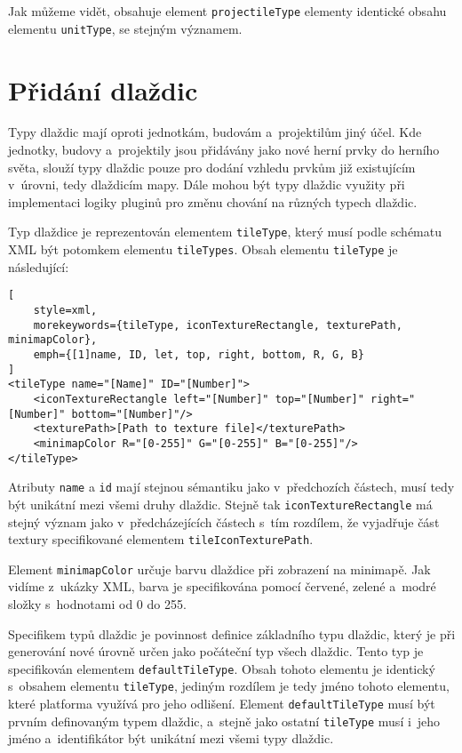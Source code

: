 Jak můžeme vidět, obsahuje element \texttt{projectileType} elementy identické obsahu elementu \texttt{unitType}, se stejným významem.


\section{Přidání dlaždic}
Typy dlaždic mají oproti jednotkám, budovám a~projektilům jiný účel. Kde jednotky, budovy a~projektily jsou přidávány jako nové herní prvky do herního světa, slouží typy dlaždic pouze pro dodání vzhledu prvkům již existujícím v~úrovni, tedy dlaždicím mapy. Dále mohou být typy dlaždic využity při implementaci logiky pluginů pro změnu chování na různých typech dlaždic.

Typ dlaždice je reprezentován elementem \texttt{tileType}, který musí podle schématu XML být potomkem elementu \texttt{tileTypes}. Obsah elementu \texttt{tileType} je následující:

\begin{lstlisting}[
	style=xml,
	morekeywords={tileType, iconTextureRectangle, texturePath, minimapColor},
	emph={[1]name, ID, let, top, right, bottom, R, G, B}
]
<tileType name="[Name]" ID="[Number]">
	<iconTextureRectangle left="[Number]" top="[Number]" right="[Number]" bottom="[Number]"/>
	<texturePath>[Path to texture file]</texturePath>
	<minimapColor R="[0-255]" G="[0-255]" B="[0-255]"/>
</tileType>
\end{lstlisting}

Atributy \texttt{name} a \texttt{id} mají stejnou sémantiku jako v~předchozích částech, musí tedy být unikátní mezi všemi druhy dlaždic. Stejně tak \texttt{iconTextureRectangle} má stejný význam jako v~předcházejících částech s~tím rozdílem, že vyjadřuje část textury specifikované elementem \texttt{tileIconTexturePath}.

Element \texttt{minimapColor} určuje barvu dlaždice při zobrazení na minimapě. Jak vidíme z~ukázky XML, barva je specifikována pomocí červené, zelené a~modré složky s~hodnotami od 0 do 255.

Specifikem typů dlaždic je povinnost definice základního typu dlaždic, který je při generování nové úrovně určen jako počáteční typ všech dlaždic. Tento typ je specifikován elementem \texttt{defaultTileType}. Obsah tohoto elementu je identický s~obsahem elementu \texttt{tileType}, jediným rozdílem je tedy jméno tohoto elementu, které platforma využívá pro jeho odlišení. Element \texttt{defaultTileType} musí být prvním definovaným typem dlaždic, a~stejně jako ostatní \texttt{tileType} musí i~jeho jméno a~identifikátor být unikátní mezi všemi typy dlaždic.

